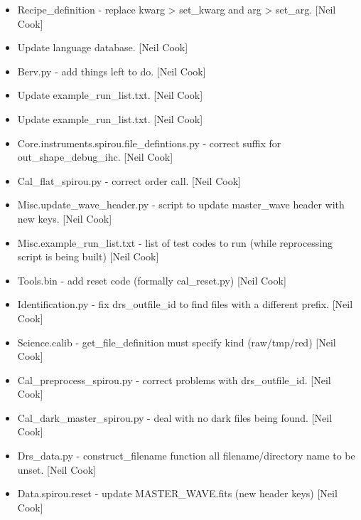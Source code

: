 \documentclass[a4paper,10pt,english]{report}
\begin{document}
\begin{itemize}
\item {} 
Recipe\_definition - replace kwarg \textendash{}\textgreater{} set\_kwarg and arg \textendash{}\textgreater{} set\_arg.
{[}Neil Cook{]}

\item {} 
Update language database. {[}Neil Cook{]}

\item {} 
Berv.py - add things left to do. {[}Neil Cook{]}

\item {} 
Update example\_run\_list.txt. {[}Neil Cook{]}

\item {} 
Update example\_run\_list.txt. {[}Neil Cook{]}

\item {} 
Core.instruments.spirou.file\_defintions.py - correct suffix for
out\_shape\_debug\_ihc. {[}Neil Cook{]}

\item {} 
Cal\_flat\_spirou.py - correct order call. {[}Neil Cook{]}

\item {} 
Misc.update\_wave\_header.py - script to update master\_wave header with
new keys. {[}Neil Cook{]}

\item {} 
Misc.example\_run\_list.txt - list of test codes to run (while
reprocessing script is being built) {[}Neil Cook{]}

\item {} 
Tools.bin - add reset code (formally cal\_reset.py) {[}Neil Cook{]}

\item {} 
Identification.py - fix drs\_outfile\_id to find files with a different
prefix. {[}Neil Cook{]}

\item {} 
Science.calib - get\_file\_definition must specify kind (raw/tmp/red)
{[}Neil Cook{]}

\item {} 
Cal\_preprocess\_spirou.py - correct problems with drs\_outfile\_id. {[}Neil
Cook{]}

\item {} 
Cal\_dark\_master\_spirou.py - deal with no dark files being found. {[}Neil
Cook{]}

\item {} 
Drs\_data.py - construct\_filename function all filename/directory name
to be unset. {[}Neil Cook{]}

\item {} 
Data.spirou.reset - update MASTER\_WAVE.fits (new header keys) {[}Neil
Cook{]}


\end{itemize}
\end{document}
